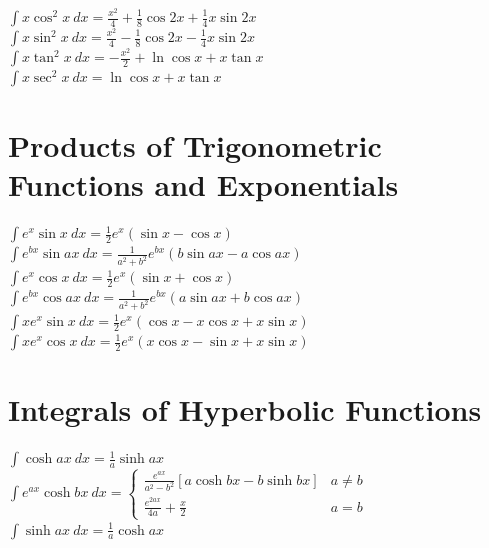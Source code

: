 \documentclass[10pt,letterpaper,landscape]{cheatsheet}
\begin{document}
$
\int x \cos^2 x \ dx = \frac{x^2}{4}+\frac{1}{8}\cos 2x + \frac{1}{4} x \sin 2x
$\\

$
\int x \sin^2 x \ dx = \frac{x^2}{4}-\frac{1}{8}\cos 2x - \frac{1}{4} x \sin 2x
$\\

$
\int x \tan^2 x \ dx = -\frac{x^2}{2} + \ln \cos x + x \tan x
$\\

$
\int x \sec^2 x \ dx = \ln \cos x + x \tan x
$\\
 
\section*{Products of Trigonometric Functions and Exponentials}

$
\int e^x \sin x \ dx = \frac{1}{2}e^x (\sin x - \cos x) 
$\\

$
\int e^{bx} \sin ax\ dx = \frac{1}{a^2+b^2}e^{bx} (b\sin ax - a\cos ax) 
$\\

$
\int e^x \cos x\ dx = \frac{1}{2}e^x (\sin x + \cos x)  
$\\

$
\int e^{bx} \cos ax\ dx = \frac{1}{a^2 + b^2} e^{bx} ( a \sin ax + b \cos ax ) 
$\\

$
\int x e^x \sin x\ dx = \frac{1}{2}e^x (\cos x - x \cos x + x \sin x) 
$\\

$
\int x e^x \cos x\ dx = \frac{1}{2}e^x (x \cos x 
- \sin x + x \sin x) 
$\\

 \section*{Integrals of Hyperbolic Functions}

$
\int \cosh ax\ dx =\frac{1}{a} \sinh ax 
$\\

$
\int e^{ax}  \cosh bx \ dx = 
\begin{cases}
\displaystyle{\frac{e^{ax}}{a^2-b^2} }[ a \cosh bx - b \sinh bx ]  & a\ne b \\
\displaystyle{\frac{e^{2ax}}{4a} + \frac{x}{2}}  & a = b
\end{cases}
$\\

$
\int \sinh ax\ dx = \frac{1}{a} \cosh ax 
$\\
\end{document}
